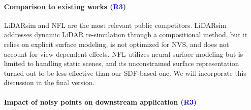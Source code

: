 \documentclass[10pt,twocolumn,letterpaper]{article}
\newcommand{\ROne}{{\textcolor{red}{\textbf{R1}}}}
\newcommand{\RThree}{{\textcolor{blue}{\textbf{R3}}}}
\begin{document}
\paragraph{Comparison to existing works (\RThree)} 
LiDARsim and NFL are the most relevant public competitors. LiDARsim addresses dynamic LiDAR re-simulation through a compositional method, but it relies on explicit surface modeling, is not optimized for NVS, and does not account for view-dependent effects. NFL utilizes neural surface modeling but is limited to handling static scenes, and its unconstrained surface representation turned out to be less effective than our SDF-based one. We will incorporate this discussion in the final version.


\paragraph{Impact of noisy points on downstream application (\RThree)}
\end{document}
